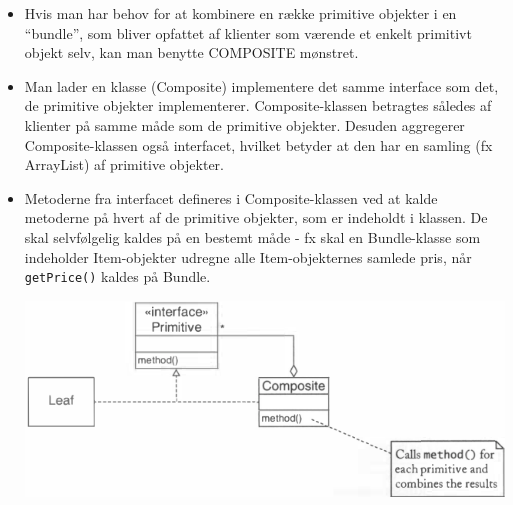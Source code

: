 \begin{itemize}
  \item Hvis man har behov for at kombinere en række primitive objekter i en “bundle”, som bliver opfattet af klienter som værende et enkelt primitivt objekt selv, kan man benytte COMPOSITE mønstret.
  \item Man lader en klasse (Composite) implementere det samme interface som det, de primitive objekter implementerer. Composite-klassen betragtes således af klienter på samme måde som de primitive objekter. Desuden aggregerer Composite-klassen også interfacet, hvilket betyder at den har en samling (fx ArrayList) af primitive objekter.
  \item Metoderne fra interfacet defineres i Composite-klassen ved at kalde metoderne på hvert af de primitive objekter, som er indeholdt i klassen. De skal selvfølgelig kaldes på en bestemt måde - fx skal en Bundle-klasse som indeholder Item-objekter udregne alle Item-objekternes samlede pris, når \verb|getPrice()| kaldes på Bundle.
  
  \begin{center}
    \includegraphics[scale=0.8]{images/composite_horstman.png}
  \end{center}

\end{itemize}

